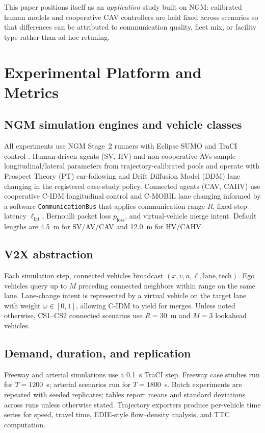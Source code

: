 \documentclass[numbered]{trbunofficial}
\begin{document}
This paper positions itself as an \emph{application} study built on NGM: calibrated human models
and cooperative CAV controllers are held fixed across scenarios so that differences can be
attributed to communication quality, fleet mix, or facility type rather than ad hoc retuning.

\section{Experimental Platform and Metrics}
\label{sec:methods}

\subsection{NGM simulation engines and vehicle classes}
All experiments use NGM Stage~2 runners with Eclipse SUMO and TraCI control \cite{BeigiNGMTool2026}.
Human-driven agents (SV, HV) and non-cooperative AVs sample longitudinal/lateral parameters
from trajectory-calibrated pools and operate with Prospect Theory (PT) car-following and Drift
Diffusion Model (DDM) lane changing in the registered case-study policy. Connected agents (CAV,
CAHV) use cooperative C-IDM longitudinal control and C-MOBIL lane changing informed by a
software \texttt{CommunicationBus} that applies communication range $R$, fixed-step latency
$\ell_{\mathrm{lat}}$, Bernoulli packet loss $p_{\mathrm{loss}}$, and virtual-vehicle merge
intent. Default lengths are 4.5~m for SV/AV/CAV and 12.0~m for HV/CAHV.

\subsection{V2X abstraction}
Each simulation step, connected vehicles broadcast
$(x,v,a,\ell,\mathrm{lane},\mathrm{tech})$. Ego vehicles query up to $M$ preceding connected
neighbors within range on the same lane. Lane-change intent is represented by a virtual vehicle
on the target lane with weight $\omega\in[0,1]$, allowing C-IDM to yield for merges. Unless noted
otherwise, CS1--CS2 connected scenarios use $R{=}30$~m and $M{=}3$ lookahead vehicles.

\subsection{Demand, duration, and replication}
Freeway and arterial simulations use a 0.1~s TraCI step. Freeway case studies run for
$T{=}1200$~s; arterial scenarios run for $T{=}1800$~s. Batch experiments are repeated with
seeded replicates; tables report means and standard deviations across runs unless otherwise
stated. Trajectory exporters produce per-vehicle time series for speed, travel time, EDIE-style
flow--density analysis, and TTC computation.
\end{document}
